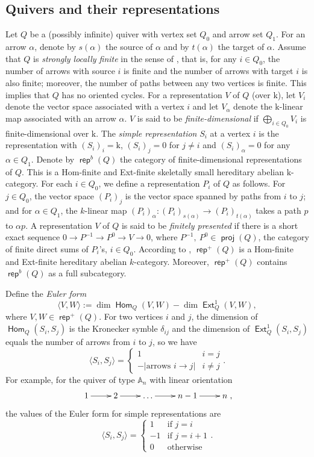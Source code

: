 \documentclass[reqno,12pt,a4paper]{amsart}
\theoremstyle{remark}
\theoremstyle{definition}
\newcommand{\opname}[1]{\operatorname{\mathsf{#1}}}
\newcommand{\proj}{\opname{proj}\nolimits}
\newcommand{\rep}{\opname{rep}\nolimits}
\newcommand{\Hom}{\opname{Hom}}
\newcommand{\Ext}{\opname{Ext}}
\newcommand{\fk}{{\mathrm k}}
\numberwithin{equation}{section}
\begin{document}
\subsection{Quivers and their representations}
\label{ss:quivers}

Let $Q$ be a (possibly infinite) quiver with vertex set $Q_0$ and arrow set $Q_1$. For an arrow $\alpha$, denote by $s(\alpha)$ the source of $\alpha$ and by $t(\alpha)$ the target of $\alpha$. Assume that $Q$ is \emph{strongly locally finite} in the sense of \cite[Section 1]{BautistaLiuPaquette13}, that is, for any $i\in Q_0$, the number of arrows with source $i$ is finite and the number of arrows with target $i$ is also finite; moreover, the number of paths between any two vertices is finite. This implies that $Q$ has no oriented cycles. For a representation $V$ of $Q$ (over $\fk$), let $V_i$ denote the vector space associated with a vertex $i$ and let $V_\alpha$ denote the $\fk$-linear map associated with an arrow $\alpha$. $V$ is said to be \emph{finite-dimensional} if $\bigoplus_{i\in Q_0} V_i$ is finite-dimensional over $\fk$. The \emph{simple representation} $S_i$ at a vertex $i$ is the representation with $(S_i)_i=\fk$, $(S_i)_j=0$ for $j\neq i$ and $(S_i)_\alpha=0$ for any $\alpha\in Q_1$.  Denote by $\rep^b(Q)$ the category of finite-dimensional representations of $Q$. This is a Hom-finite and Ext-finite skeletally small hereditary abelian $\fk$-category. For each $i\in Q_0$, we define a representation $P_i$ of $Q$ as follows. For $j\in Q_0$, the vector space $(P_i)_j$ is the vector space spanned by paths from $i$ to $j$; and for $\alpha\in Q_1$, the $k$-linear map $(P_i)_{\alpha}\colon (P_i)_{s(\alpha)}\to (P_i)_{t(\alpha)}$ takes a path $p$ to $\alpha p$. A representation $V$ of $Q$ is said to be \emph{finitely presented} if there is a short exact sequence $0\to P^{-1}\to P^0\to V\to 0$, where $P^{-1},~P^0\in\proj(Q)$, the category of finite direct sums of $P_i$'s, $i\in Q_0$. According to \cite[Proposition 1.15]{BautistaLiuPaquette13}, $\rep^+(Q)$ is a Hom-finite and Ext-finite hereditary abelian $k$-category. Moreover, $\rep^+(Q)$ contains $\rep^b(Q)$ as a full subcategory.

Define the \emph{Euler form}
\[
\langle V,W\rangle:=\dim \Hom_Q(V,W)-\dim \Ext^1_Q(V,W),
\]
where $V,W\in \rep^+(Q)$.
For two vertices $i$ and $j$, the dimension of $\Hom_Q(S_i,S_j)$ is the Kronecker symble $\delta_{ij}$ and the dimension of $\Ext^1_Q(S_i,S_j)$ equals the number of arrows from $i$ to $j$, so we have
\[
\langle S_i,S_j\rangle=\begin{cases} 1 & i=j\\ -|\text{arrows }i\to j| & i\neq j\end{cases}.
\]
For example, for the quiver of type $\mathbb{A}_n$ with linear orientation
\[\xymatrix{1\ar[r]&2\ar[r]&\ldots\ar[r]&n-1\ar[r]&n},\]
the values of the Euler form for simple representations are
\[\langle S_i,S_{j}\rangle=\begin{cases} 1 & \text{if } j=i \\
    -1 & \text{if } j=i+1 \\
    0 & \text{otherwise}
  \end{cases}.\]
\end{document}

